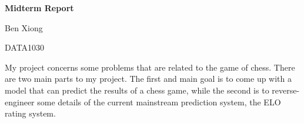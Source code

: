 \documentclass[12pt, letterpaper]{article}
\begin{document}
\begin{center}

	\vspace*{0.3cm}
	
	\textbf{\Large Midterm Report}
	
	\vspace{0.5cm}
	
	Ben Xiong
	
	DATA1030
	
	\vspace{0.1cm}
	
	\setlength{\parskip}{0.0in}
	
	\begin{flushleft}
	\begin{small}
	
	
	My project concerns some problems that are related to the game of chess. There are two main parts to my project. The first and main goal is to come up with a model that can predict the results of a chess game, while the second is to reverse-engineer some details of the current mainstream prediction system, the ELO rating system.
	
	\end{small}
	\end{flushleft}
	
	\vspace{0.1cm}
	
\end{center}

\setlength{\parskip}{0.2cm}
\end{document}
